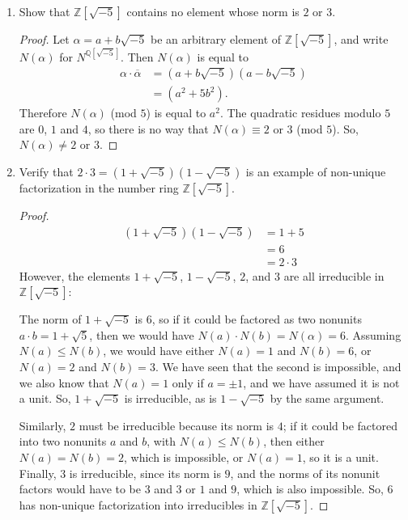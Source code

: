 \documentclass[12pt]{article}
\newcommand{\Q}{\mathbb{Q}}
\newcommand{\Z}{\mathbb{Z}}
\theoremstyle{definition}
\newenvironment{problem}[2][Problem]{\begin{trivlist}
\item[\hskip \labelsep {\bfseries #1}\hskip \labelsep {\bfseries #2.}]}{\end{trivlist}}
\begin{document}
\begin{problem}{15}
	\begin{enumerate}[label=(\alph*)]
		\item Show that $\Z[\sqrt {-5}]$ contains no element whose norm is $2$ or $3$.
			\begin{proof}
				Let $\alpha = a + b\sqrt{-5}$ be an arbitrary element of $\Z[\sqrt{-5}]$, and write $N(\alpha)$ for $N^{\Q[\sqrt{-5}]}$. Then $N(\alpha)$ is equal to 
				\begin{align*}
					\alpha \cdot \overline \alpha &= (a + b \sqrt{-5})(a - b \sqrt{-5})\\
					&= (a^2 + 5b^2).
				\end{align*}
				Therefore $N(\alpha)$ (mod $5$) is equal to $a^2$. The quadratic residues modulo $5$ are $0$, $1$ and $4$, so there is no way that $N(\alpha) \equiv 2$ or $3$ (mod $5$). So, $N(\alpha) \neq 2$ or $3$.
			\end{proof}
		\item Verify that $2 \cdot 3 = (1 + \sqrt {-5})(1 - \sqrt{-5})$ is an example of non-unique factorization in the number ring $\Z[\sqrt{-5}]$.
			\begin{proof}
				\begin{align*}
					(1 + \sqrt{-5})(1 - \sqrt{-5}) &= 1 + 5\\
					&= 6\\
					&= 2 \cdot 3
				\end{align*}
				However, the elements $1 + \sqrt{-5}$, $1 - \sqrt{-5}$, $2$, and $3$ are all irreducible in $\Z[\sqrt{-5}]$: 
				\par The norm of $1 + \sqrt{-5}$ is $6$, so if it could be factored as two nonunits $a\cdot b = 1 + \sqrt{5}$, then we would have $N(a) \cdot N(b) = N(\alpha) = 6$. Assuming $N(a) \leq N(b)$, we would have either $N(a) = 1$ and $N(b) = 6$, or $N(a) = 2$ and $N(b) = 3$. We have seen that the second is impossible, and we also know that $N(a) = 1$ only if $a = \pm 1$, and we have assumed it is not a unit. So, $1 + \sqrt{-5}$ is irreducible, as is $1 - \sqrt{-5}$ by the same argument.
				\par Similarly, $2$ must be irreducible because its norm is $4$; if it could be factored into two nonunits $a$ and $b$, with $N(a) \leq N(b)$, then either $N(a) = N(b) = 2$, which is impossible, or $N(a) = 1$, so it is a unit. Finally, $3$ is irreducible, since its norm is $9$, and the norms of its nonunit factors would have to be $3$ and $3$ or $1$ and $9$, which is also impossible. So, $6$ has non-unique factorization into irreducibles in $\Z[\sqrt{-5}]$.
			\end{proof}
	\end{enumerate}
\end{problem}
\end{document}
